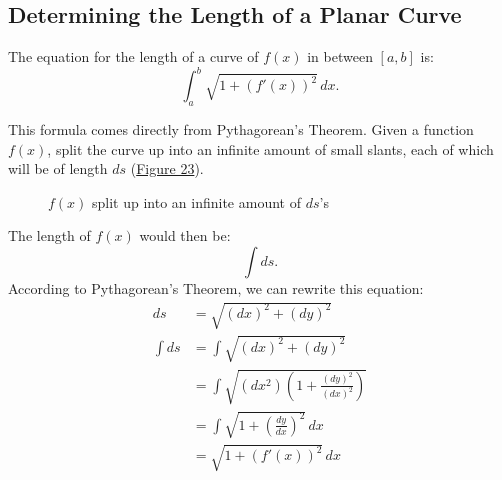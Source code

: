 \documentclass[12pt]{article}
\begin{document}
        \subsection{Determining the Length of a Planar Curve}
            The equation for the length of a curve of $f(x)$ in between $[a, b]$ is:
            \[ \int_a^b \sqrt{1 + \left( f'(x) \right)^2} \, dx.\]

            This formula comes directly from Pythagorean's Theorem. Given a function $f(x)$, split the curve up into an infinite amount of small slants, each of which will be of length $ds$ (\hyperref[fig:planarcurve]{Figure 23}).

            \begin{figure}[H]
                \begin{center}
                    \caption{$f(x)$ split up into an infinite amount of $ds$'s}
                    \label{fig:planarcurve}
                \end{center}
            \end{figure}

            \noindent The length of $f(x)$ would then be:
            \[ \int ds. \]
            According to Pythagorean's Theorem, we can rewrite this equation:
            \begin{align*}
                ds &= \sqrt{(dx)^2 + (dy)^2} \\
                \int ds &= \int \sqrt{(dx)^2 + (dy)^2} \\
                &= \int \sqrt{(dx^2) \left( 1 + \frac{(dy)^2}{(dx)^2} \right)} \\[6pt]
                &= \int \sqrt{1 + \left(\frac{dy}{dx} \right)^2} \, dx \\[6pt]
                &= \sqrt{1 + \left( f'(x) \right)^2} \, dx
            \end{align*}
\end{document}
